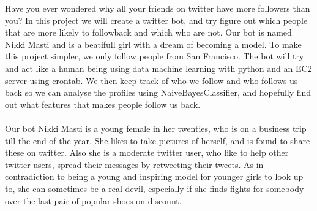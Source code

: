 Have you ever wondered why all your friends on twitter have more followers than you?
In this project we will create a twitter bot, and try figure out which people
that are more likely to followback and which who are not. Our bot is named Nikki Masti
and is a beatifull girl with a dream of becoming a model. To make this project simpler,
we only follow people from San Francisco. The bot will try and act like a human being using
data machine learning with python and an EC2 server using crontab. We then keep track
of who we follow and who follows us back so we can analyse the profiles using NaiveBayesClassifier,
and hopefully find out what features that makes people follow us back.\\
\\
Our bot Nikki Masti is a young female in her twenties, who is on a business trip till the end of the year. She likes to take pictures of herself, and is found to share these on twitter. Also she is a moderate twitter user, who like to help other twitter users, spread their messages by retweeting their tweets. As in contradiction to being a young and inspiring model for younger girls to look up to, she can sometimes be a real devil, especially if she finds fights for somebody over the last pair of popular shoes on discount.

